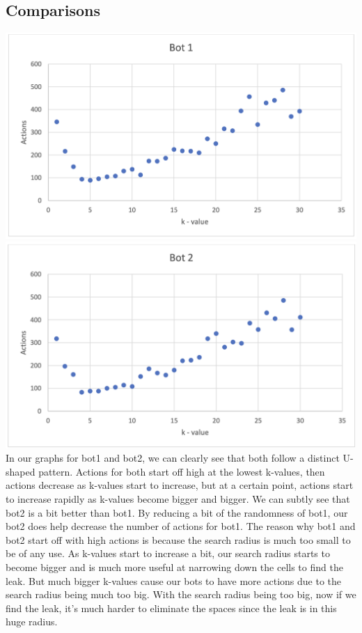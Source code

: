 \documentclass[12pt]{article}
\begin{document}
 \subsection*{Comparisons}
 \includegraphics*[scale=0.5]{Bot1} \\
 \includegraphics*[scale=0.5]{Bot2} \\
 In our graphs for bot1 and bot2, we can clearly see that both follow a distinct U-shaped pattern. 
 Actions for both start off high at the lowest k-values, then actions decrease as k-values start to 
 increase, but at a certain point, actions start to increase rapidly as k-values become bigger and bigger.
  We can subtly see that bot2 is a bit better than bot1. By reducing a bit of the randomness of bot1, our 
  bot2 does help decrease the number of actions for bot1. The reason why bot1 and bot2 start off with high 
  actions is because the search radius is much too small to be of any use. As k-values start to increase 
  a bit, our search radius starts to become bigger and is much more useful at narrowing down the cells to 
  find the leak. But much bigger k-values cause our bots to have more actions due to the search radius
   being much too big. With the search radius being too big, now if we find the leak, it's much harder to 
   eliminate the spaces since the leak is in this huge radius.
\end{document}
